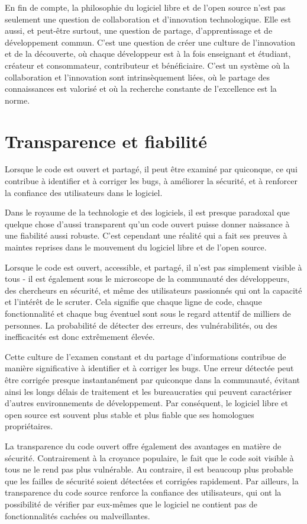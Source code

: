 En fin de compte, la philosophie du logiciel libre et de l'open source n'est pas seulement une question de collaboration et d'innovation technologique. Elle est aussi, et peut-être surtout, une question de partage, d'apprentissage et de développement commun. C'est une question de créer une culture de l'innovation et de la découverte, où chaque développeur est à la fois enseignant et étudiant, créateur et consommateur, contributeur et bénéficiaire. C'est un système où la collaboration et l'innovation sont intrinsèquement liées, où le partage des connaissances est valorisé et où la recherche constante de l'excellence est la norme.

\section{Transparence et fiabilité} 
Lorsque le code est ouvert et partagé, il peut être examiné par quiconque, ce qui contribue à identifier et à corriger les bugs, à améliorer la sécurité, et à renforcer la confiance des utilisateurs dans le logiciel.

Dans le royaume de la technologie et des logiciels, il est presque paradoxal que quelque chose d'aussi transparent qu'un code ouvert puisse donner naissance à une fiabilité aussi robuste. C'est cependant une réalité qui a fait ses preuves à maintes reprises dans le mouvement du logiciel libre et de l'open source.

Lorsque le code est ouvert, accessible, et partagé, il n'est pas simplement visible à tous - il est également sous le microscope de la communauté des développeurs, des chercheurs en sécurité, et même des utilisateurs passionnés qui ont la capacité et l'intérêt de le scruter. Cela signifie que chaque ligne de code, chaque fonctionnalité et chaque bug éventuel sont sous le regard attentif de milliers de personnes. La probabilité de détecter des erreurs, des vulnérabilités, ou des inefficacités est donc extrêmement élevée.

Cette culture de l'examen constant et du partage d'informations contribue de manière significative à identifier et à corriger les bugs. Une erreur détectée peut être corrigée presque instantanément par quiconque dans la communauté, évitant ainsi les longs délais de traitement et les bureaucraties qui peuvent caractériser d'autres environnements de développement. Par conséquent, le logiciel libre et open source est souvent plus stable et plus fiable que ses homologues propriétaires.

La transparence du code ouvert offre également des avantages en matière de sécurité. Contrairement à la croyance populaire, le fait que le code soit visible à tous ne le rend pas plus vulnérable. Au contraire, il est beaucoup plus probable que les failles de sécurité soient détectées et corrigées rapidement. Par ailleurs, la transparence du code source renforce la confiance des utilisateurs, qui ont la possibilité de vérifier par eux-mêmes que le logiciel ne contient pas de fonctionnalités cachées ou malveillantes.

